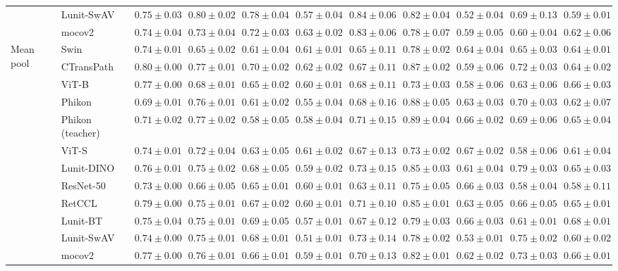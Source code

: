 \begin{tabular}{ll|cccc|c|cccc}
 & Lunit-SwAV & $0.75 \pm 0.03$ & $\mathbf{0.80 \pm 0.02}$ & $0.78 \pm 0.04$ & $0.57 \pm 0.04$ & $0.84 \pm 0.06$ & $0.82 \pm 0.04$ & $0.52 \pm 0.04$ & $0.69 \pm 0.13$ & $0.59 \pm 0.01$ \\
 & mocov2 & $0.74 \pm 0.04$ & $0.73 \pm 0.04$ & $0.72 \pm 0.03$ & $\mathbf{0.63 \pm 0.02}$ & $0.83 \pm 0.06$ & $0.78 \pm 0.07$ & $0.59 \pm 0.05$ & $0.60 \pm 0.04$ & $0.62 \pm 0.06$ \\
\cline{1-11}
\multirow[t]{12}{*}{Mean pool} & Swin & $0.74 \pm 0.01$ & $0.65 \pm 0.02$ & $0.61 \pm 0.04$ & $0.61 \pm 0.01$ & $0.65 \pm 0.11$ & $0.78 \pm 0.02$ & $0.64 \pm 0.04$ & $0.65 \pm 0.03$ & $0.64 \pm 0.01$ \\
 & CTransPath & $\mathbf{0.80 \pm 0.00}$ & $0.77 \pm 0.01$ & $\mathbf{0.70 \pm 0.02}$ & $\mathbf{0.62 \pm 0.02}$ & $0.67 \pm 0.11$ & $0.87 \pm 0.02$ & $0.59 \pm 0.06$ & $0.72 \pm 0.03$ & $0.64 \pm 0.02$ \\
 & ViT-B & $0.77 \pm 0.00$ & $0.68 \pm 0.01$ & $0.65 \pm 0.02$ & $0.60 \pm 0.01$ & $0.68 \pm 0.11$ & $0.73 \pm 0.03$ & $0.58 \pm 0.06$ & $0.63 \pm 0.06$ & $0.66 \pm 0.03$ \\
 & Phikon & $0.69 \pm 0.01$ & $0.76 \pm 0.01$ & $0.61 \pm 0.02$ & $0.55 \pm 0.04$ & $0.68 \pm 0.16$ & $0.88 \pm 0.05$ & $0.63 \pm 0.03$ & $0.70 \pm 0.03$ & $0.62 \pm 0.07$ \\
 & Phikon (teacher) & $0.71 \pm 0.02$ & $\mathbf{0.77 \pm 0.02}$ & $0.58 \pm 0.05$ & $0.58 \pm 0.04$ & $0.71 \pm 0.15$ & $\mathbf{0.89 \pm 0.04}$ & $0.66 \pm 0.02$ & $0.69 \pm 0.06$ & $0.65 \pm 0.04$ \\
 & ViT-S & $0.74 \pm 0.01$ & $0.72 \pm 0.04$ & $0.63 \pm 0.05$ & $0.61 \pm 0.02$ & $0.67 \pm 0.13$ & $0.73 \pm 0.02$ & $\mathbf{0.67 \pm 0.02}$ & $0.58 \pm 0.06$ & $0.61 \pm 0.04$ \\
 & Lunit-DINO & $0.76 \pm 0.01$ & $0.75 \pm 0.02$ & $0.68 \pm 0.05$ & $0.59 \pm 0.02$ & $\mathbf{0.73 \pm 0.15}$ & $0.85 \pm 0.03$ & $0.61 \pm 0.04$ & $\mathbf{0.79 \pm 0.03}$ & $0.65 \pm 0.03$ \\
 & ResNet-50 & $0.73 \pm 0.00$ & $0.66 \pm 0.05$ & $0.65 \pm 0.01$ & $0.60 \pm 0.01$ & $0.63 \pm 0.11$ & $0.75 \pm 0.05$ & $0.66 \pm 0.03$ & $0.58 \pm 0.04$ & $0.58 \pm 0.11$ \\
 & RetCCL & $0.79 \pm 0.00$ & $0.75 \pm 0.01$ & $0.67 \pm 0.02$ & $0.60 \pm 0.01$ & $0.71 \pm 0.10$ & $0.85 \pm 0.01$ & $0.63 \pm 0.05$ & $0.66 \pm 0.05$ & $0.65 \pm 0.01$ \\
 & Lunit-BT & $0.75 \pm 0.04$ & $0.75 \pm 0.01$ & $0.69 \pm 0.05$ & $0.57 \pm 0.01$ & $0.67 \pm 0.12$ & $0.79 \pm 0.03$ & $0.66 \pm 0.03$ & $0.61 \pm 0.01$ & $\mathbf{0.68 \pm 0.01}$ \\
 & Lunit-SwAV & $0.74 \pm 0.00$ & $0.75 \pm 0.01$ & $0.68 \pm 0.01$ & $0.51 \pm 0.01$ & $0.73 \pm 0.14$ & $0.78 \pm 0.02$ & $0.53 \pm 0.01$ & $0.75 \pm 0.02$ & $0.60 \pm 0.02$ \\
 & mocov2 & $0.77 \pm 0.00$ & $0.76 \pm 0.01$ & $0.66 \pm 0.01$ & $0.59 \pm 0.01$ & $0.70 \pm 0.13$ & $0.82 \pm 0.01$ & $0.62 \pm 0.02$ & $0.73 \pm 0.03$ & $0.66 \pm 0.01$ \\
\cline{1-11}
\bottomrule
\end{tabular}
